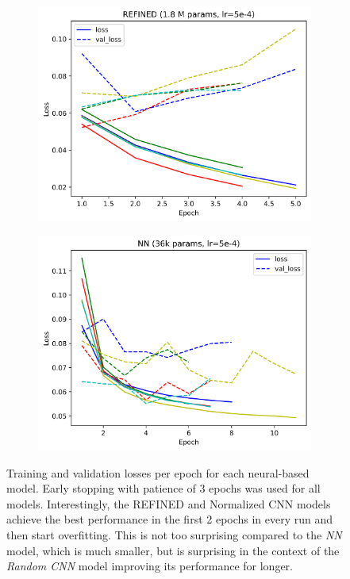 \begin{figure}
\begin{subfigure}{0.45\textwidth}
    \includegraphics[width=1\linewidth]{Refined_loss.png}
\end{subfigure}%
\begin{subfigure}{0.45\textwidth}
    \centering
    \includegraphics[width=1\linewidth]{NN_loss.png}
\end{subfigure}
\caption{Training and validation losses per epoch for each neural-based model. Early stopping with patience of 3 epochs was used for all models. Interestingly, the REFINED and Normalized CNN models achieve the best performance in the first 2 epochs in every run and then start overfitting. This is not too surprising compared to the \textit{NN} model, which is much smaller, but is surprising in the context of the \textit{Random CNN} model improving its performance for longer.}
\label{fig:enter-label}
\end{figure}

